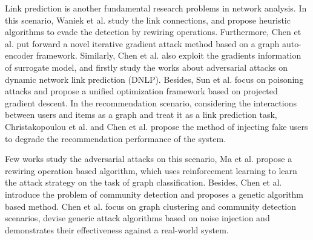 Link prediction is another fundamental research problems in network analysis. In this scenario,  Waniek et al. \cite{waniek2018attack} study the link connections, and propose heuristic algorithms to evade the detection by rewiring operations. Furthermore, Chen et al. \cite{chen2018link} put forward a novel iterative gradient attack method based on a graph auto-encoder framework. Similarly, Chen et al. \cite{chen2019time} also exploit the gradients information of surrogate model, and firstly study the works about adversarial attacks on dynamic network link prediction (DNLP). Besides, Sun et al. \cite{sun2018data} focus on poisoning attacks and propose a unified optimization framework based on projected gradient descent. In the recommendation scenario, considering the interactions between users and items as a graph and treat it as a link prediction task, Christakopoulou et al. \cite{christakopoulou2018adversarial} and Chen et al. \cite{chen2019data} propose the method of injecting fake users to degrade the recommendation performance of the system.

Few works study the adversarial attacks on this scenario, Ma et al. \cite{ma2019attacking} propose a rewiring operation based algorithm, which uses reinforcement learning to learn the attack strategy on the task of graph classification. Besides, Chen et al. \cite{chen2019ga} introduce the problem of community detection and proposes a genetic algorithm based method. Chen et al. \cite{chen2017practical} focus on graph clustering and community detection scenarios, devise generic attack algorithms based on noise injection and demonstrates their effectiveness against a real-world system.

